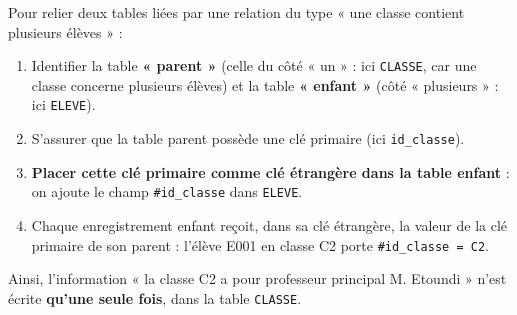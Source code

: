 \documentclass[11pt]{article}
\begin{document}
\begin{methode}
Pour relier deux tables liées par une relation du type « une classe contient plusieurs élèves » :
\begin{enumerate}
\item Identifier la table \textbf{« parent »} (celle du côté « un » : ici \texttt{CLASSE}, car une classe concerne plusieurs élèves) et la table \textbf{« enfant »} (côté « plusieurs » : ici \texttt{ELEVE}).
\item S'assurer que la table parent possède une clé primaire (ici \texttt{id\_classe}).
\item \textbf{Placer cette clé primaire comme clé étrangère dans la table enfant} : on ajoute le champ \texttt{\#id\_classe} dans \texttt{ELEVE}.
\item Chaque enregistrement enfant reçoit, dans sa clé étrangère, la valeur de la clé primaire de son parent : l'élève E001 en classe C2 porte \texttt{\#id\_classe = C2}.
\end{enumerate}
Ainsi, l'information « la classe C2 a pour professeur principal M. Etoundi » n'est écrite \textbf{qu'une seule fois}, dans la table \texttt{CLASSE}.
\end{methode}
\end{document}
